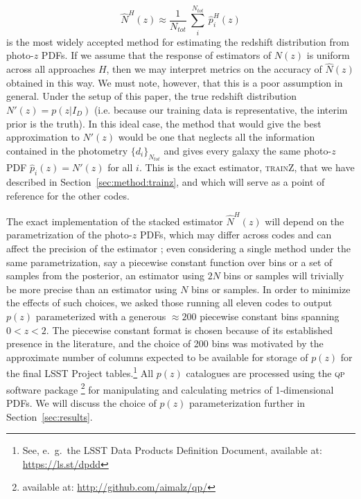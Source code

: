 \documentclass[usenatbib]{mn2e}
\newcommand{\trainz}{\textsc{trainZ}}
\newcommand{\red}[1]{\textcolor{red}{#1}}
\begin{document}
\begin{equation} \label{eq:stacked}
\hat{N}^{H}(z) \approx \frac{1}{N_{tot}}\ \sum_{i}^{N_{tot}}\ \hat{p}^{H}_{i}(z)
\end{equation}
is the most widely accepted method for estimating the redshift distribution from photo-$z$ PDFs. 
If we assume that the response of estimators of $N(z)$ is uniform across all approaches $H$, then we may interpret metrics on the accuracy of $\hat{N}(z)$ obtained in this way. 
We must note, however, that this is a poor assumption in general. 
Under the setup of this paper, the true redshift distribution $N'(z) = p(z | I_{D})$ (i.e. because our training data is representative, the interim prior is the truth).  In this ideal case, the method that would give the best approximation to $N'(z)$ would be one that neglects all the information contained in the photometry $\{d_{i}\}_{N_{tot}}$ and gives every galaxy the same photo-$z$ PDF $\hat{p}_{i}(z) = N'(z)$ for all $i$.  This is the exact estimator, \trainz, that we have described in Section~\ref{sec:method:trainz}, and which will serve as a point of reference for the other codes.

The exact implementation of the stacked estimator $\hat{N}^{H}(z)$ will depend on the parametrization of the photo-$z$ PDFs, which may differ across codes and can affect the precision of the estimator \citep{Malz:qp}; even considering a single method under the same parametrization, say a piecewise constant function over bins or a set of samples from the posterior, an estimator using $2N$ bins or samples will trivially be more precise than an estimator using $N$ bins or samples.
In order to minimize the effects of such choices, we asked those running all eleven codes to output $p(z)$ parameterized with a generous $\approx 200$ piecewise constant bins spanning $0<z<2$.  
The piecewise constant format is chosen because of its established presence in the literature, and the choice of 200 bins was motivated by the approximate number of columns expected to be available for storage of $p(z)$ for the final LSST Project tables.\footnote{See, e.~g.~the LSST Data Products Definition Document, available at: \url{https://ls.st/dpdd}}  
All $p(z)$ catalogues are processed using the \textsc{qp} software package \citep{Malz:qp}\footnote{available at: \url{http://github.com/aimalz/qp/}} for manipulating and calculating metrics of 1-dimensional PDFs.  
We will discuss the choice of $p(z)$ parameterization further in Section~\ref{sec:results}.
\end{document}
